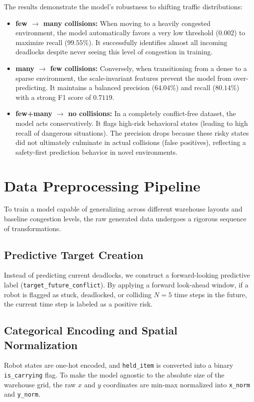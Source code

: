 \documentclass[12pt]{article}
\begin{document}
The results demonstrate the model's robustness to shifting traffic distributions:
\begin{itemize}
    \item \textbf{few $\rightarrow$ many collisions:} When moving to a heavily congested environment, the model automatically favors a very low threshold ($0.002$) to maximize recall ($99.55\%$). It successfully identifies almost all incoming deadlocks despite never seeing this level of congestion in training.
    \item \textbf{many $\rightarrow$ few collisions:} Conversely, when transitioning from a dense to a sparse environment, the scale-invariant features prevent the model from over-predicting. It maintains a balanced precision ($64.04\%$) and recall ($80.14\%$) with a strong F1 score of $0.7119$.
    \item \textbf{few+many $\rightarrow$ no collisions:} In a completely conflict-free dataset, the model acts conservatively. It flags high-risk behavioral states (leading to high recall of dangerous situations). The precision drops because these risky states did not ultimately culminate in actual collisions (false positives), reflecting a safety-first prediction behavior in novel environments.
\end{itemize}

\section{Data Preprocessing Pipeline}
To train a model capable of generalizing across different warehouse layouts and baseline congestion levels, the raw generated data undergoes a rigorous sequence of transformations. 

\subsection{Predictive Target Creation}
Instead of predicting current deadlocks, we construct a forward-looking predictive label (\texttt{target\_future\_conflict}). By applying a forward look-ahead window, if a robot is flagged as stuck, deadlocked, or colliding $N=5$ time steps in the future, the current time step is labeled as a positive risk.

\subsection{Categorical Encoding and Spatial Normalization}
Robot states are one-hot encoded, and \texttt{held\_item} is converted into a binary \texttt{is\_carrying} flag. To make the model agnostic to the absolute size of the warehouse grid, the raw $x$ and $y$ coordinates are min-max normalized into \texttt{x\_norm} and \texttt{y\_norm}.
\end{document}
